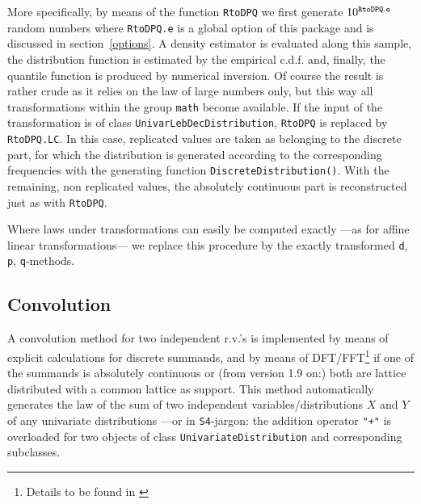 \documentclass[11pt]{article}
\newcommand{\code}[1]{{\tt #1}}
\begin{document}
More specifically, by means of the function
\code{RtoDPQ} we first generate $10^{\footnotesize\tt RtoDPQ.e}$
random numbers where \code{RtoDPQ.e} is a global option of this package and is
discussed in section~{\ref{options}}. %
A density estimator is evaluated along this sample, the distribution function is
estimated by the empirical c.d.f. and, finally, the quantile function is
produced by numerical inversion.
Of course the result is rather crude as it relies on the law of large numbers
only, but this way all transformations within the group \code{math} become
available.
If the input of the transformation is of class \code{UnivarLebDecDistribution},
\code{RtoDPQ} is replaced by \code{RtoDPQ.LC}. In this case, replicated values
are taken as belonging to the discrete part, for which the distribution is
generated according to the corresponding frequencies with the generating
function \code{DiscreteDistribution()}. With the remaining, non replicated
values, the absolutely continuous part is reconstructed just as with \code{RtoDPQ}.

Where laws under transformations can easily be computed exactly ---as for affine
linear transformations--- we replace this procedure by the exactly transformed
\code{d}, \code{p}, \code{q}-methods.
%
\subsection{Convolution}
%
A convolution method for two independent r.v.'s is implemented by means
of explicit calculations for discrete summands, and by means of
DFT/FFT\footnote{Details to be found in \cite{K:R:S:04}} if one of the summands is
absolutely continuous or (from version 1.9 on:) both are lattice distributed
with a common lattice as support.
This method automatically generates the law of the sum of two independent
variables/distributions $X$ and $Y$ of any univariate distributions ---or
in {\tt S4}-jargon: the addition operator \code{"+"} is overloaded for two
objects of class \code{UnivariateDistribution} and corresponding subclasses.
%
\end{document}
